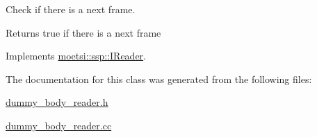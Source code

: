 Check if there is a next frame. 

\begin{DoxyReturn}{Returns}
true if there is a next frame 
\end{DoxyReturn}


Implements \hyperlink{classmoetsi_1_1ssp_1_1IReader_af9186ba41e136dc4ec3242b5dd55fa04}{moetsi\+::ssp\+::\+I\+Reader}.



The documentation for this class was generated from the following files\+:\begin{DoxyCompactItemize}
\item 
\hyperlink{dummy__body__reader_8h}{dummy\+\_\+body\+\_\+reader.\+h}\item 
\hyperlink{dummy__body__reader_8cc}{dummy\+\_\+body\+\_\+reader.\+cc}\end{DoxyCompactItemize}
